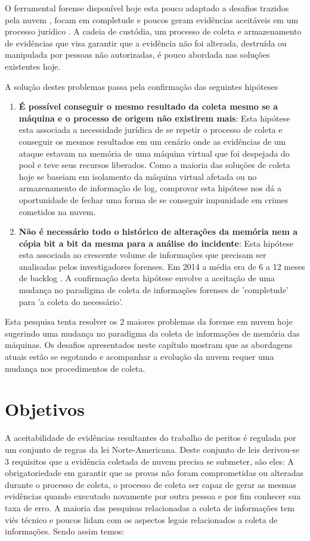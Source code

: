 \documentclass[12pt,				%
	openright,			%
	oneside,			%
	a4paper,			%
	english,			%
	brazil				%
	]{abntex2}
\begin{document}
O ferramental forense disponível hoje esta pouco adaptado a desafios trazidos pela nuvem \cite{Dykstra2012a}, focam em completude e poucos geram evidências aceitáveis em um 
processo jurídico \cite{Reichert2015}. A cadeia de custódia, um processo de coleta e armazenamento de evidências que visa garantir que a evidência não foi alterada, destruída 
ou manipulada por pessoas não autorizadas, é pouco abordada nas soluções existentes hoje. 

A solução destes problemas passa pela confirmação das seguintes hipóteses

\begin{enumerate}
 \item \textbf{É possível conseguir o mesmo resultado da coleta mesmo se a máquina e o processo de origem não existirem mais}: Esta hipótese esta associada a necessidade jurídica de se 
 repetir o processo de coleta e conseguir os mesmos resultados em um cenário onde as evidências de um ataque estavam na memória de uma máquina virtual que foi despejada do pool e
 teve seus recursos liberados.
 Como a maioria das soluções de coleta hoje se baseiam em isolamento da máquina virtual afetada ou no armazenamento de informação de log, comprovar esta hipótese nos dá
 a oportunidade de fechar uma forma de se conseguir impunidade em crimes cometidos na nuvem.
 \item \textbf{Não é necessário todo o histórico de alterações da memória nem a cópia bit a bit da mesma para a análise do incidente}: Esta hipótese esta associada ao crescente
 volume de informações que precisam ser analisadas pelos investigadores forenses. Em 2014 a média era de 6 a 12 meses de backlog \cite{Quick2014}. A confirmação desta hipótese
 envolve a aceitação de uma mudança no paradigma de coleta de informações forenses de 'completude' para 'a coleta do necessário'.
\end{enumerate}

Esta pesquisa tenta resolver os 2 maiores problemas da forense em nuvem hoje sugerindo uma mudança no paradigma da coleta de informações de memória das máquinas. Os desafios apresentados
neste capítulo mostram que as abordagens atuais estão se esgotando e acompanhar a evolução da nuvem requer uma mudança nos procedimentos de coleta.

\chapter{Objetivos} \label{chap:obj}
A aceitabilidade de evidências resultantes do trabalho de peritos é regulada por um conjunto de regras da lei Norte-Americana. Deste conjunto de leis derivou-se 3 requisitos que
a evidência coletada de nuvem precisa se submeter, são eles: A obrigatoriedade em garantir que as provas não foram comprometidas ou alteradas durante o processo de coleta, o processo
de coleta ser capaz de gerar as mesmas evidências quando executado novamente por outra pessoa e por fim conhecer sua taxa de erro. A maioria das pesquisas relacionadas a coleta de 
informações tem viés técnico e poucos lidam com os aspectos legais relacionados a coleta de informações. Sendo assim temos:\\
\end{document}
